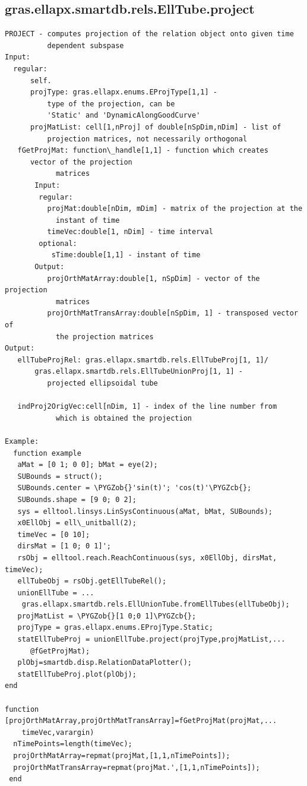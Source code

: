 \documentclass[letterpaper,10pt,english]{sphinxmanual}
\def\PYGZob{\char`\{}
\def\PYGZcb{\char`\}}
\begin{document}
\subsection{gras.ellapx.smartdb.rels.EllTube.project}
\label{chap_functions:gras-ellapx-smartdb-rels-elltube-project}
\begin{Verbatim}[commandchars=\\\{\}]
PROJECT - computes projection of the relation object onto given time
          dependent subspase
Input:
  regular:
      self.
      projType: gras.ellapx.enums.EProjType[1,1] -
          type of the projection, can be
          'Static' and 'DynamicAlongGoodCurve'
      projMatList: cell[1,nProj] of double[nSpDim,nDim] - list of
          projection matrices, not necessarily orthogonal
   fGetProjMat: function\_handle[1,1] - function which creates
      vector of the projection
            matrices
       Input:
        regular:
          projMat:double[nDim, mDim] - matrix of the projection at the
            instant of time
          timeVec:double[1, nDim] - time interval
        optional:
           sTime:double[1,1] - instant of time
       Output:
          projOrthMatArray:double[1, nSpDim] - vector of the projection
            matrices
          projOrthMatTransArray:double[nSpDim, 1] - transposed vector of
            the projection matrices
Output:
   ellTubeProjRel: gras.ellapx.smartdb.rels.EllTubeProj[1, 1]/
       gras.ellapx.smartdb.rels.EllTubeUnionProj[1, 1] -
          projected ellipsoidal tube

   indProj2OrigVec:cell[nDim, 1] - index of the line number from
            which is obtained the projection

Example:
  function example
   aMat = [0 1; 0 0]; bMat = eye(2);
   SUBounds = struct();
   SUBounds.center = \PYGZob{}'sin(t)'; 'cos(t)'\PYGZcb{};
   SUBounds.shape = [9 0; 0 2];
   sys = elltool.linsys.LinSysContinuous(aMat, bMat, SUBounds);
   x0EllObj = ell\_unitball(2);
   timeVec = [0 10];
   dirsMat = [1 0; 0 1]';
   rsObj = elltool.reach.ReachContinuous(sys, x0EllObj, dirsMat, timeVec);
   ellTubeObj = rsObj.getEllTubeRel();
   unionEllTube = ...
    gras.ellapx.smartdb.rels.EllUnionTube.fromEllTubes(ellTubeObj);
   projMatList = \PYGZob{}[1 0;0 1]\PYGZcb{};
   projType = gras.ellapx.enums.EProjType.Static;
   statEllTubeProj = unionEllTube.project(projType,projMatList,...
      @fGetProjMat);
   plObj=smartdb.disp.RelationDataPlotter();
   statEllTubeProj.plot(plObj);
end

function [projOrthMatArray,projOrthMatTransArray]=fGetProjMat(projMat,...
    timeVec,varargin)
  nTimePoints=length(timeVec);
  projOrthMatArray=repmat(projMat,[1,1,nTimePoints]);
  projOrthMatTransArray=repmat(projMat.',[1,1,nTimePoints]);
 end
\end{Verbatim}
\end{document}
